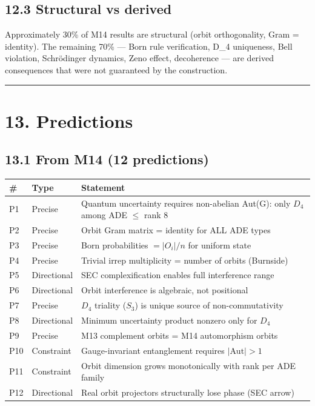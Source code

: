 \documentclass[11pt,a4paper]{article}
\begin{document}
\subsection*{12.3 Structural vs derived}

Approximately 30\% of M14 results are structural (orbit orthogonality, Gram = identity). The remaining 70\% — Born rule verification, D\_4 uniqueness, Bell violation, Schrödinger dynamics, Zeno effect, decoherence — are derived consequences that were not guaranteed by the construction.

\begin{center}\rule{0.5\linewidth}{0.4pt}\end{center}

\section*{13. Predictions}

\subsection*{13.1 From M14 (12 predictions)}

\begin{longtable}[]{@{}lll@{}}
\toprule
\# & Type & Statement \\
\midrule\endhead
P1 & Precise & Quantum uncertainty requires non-abelian Aut(G): only $D_4$ among ADE $\leq$ rank 8 \\
P2 & Precise & Orbit Gram matrix = identity for ALL ADE types \\
P3 & Precise & Born probabilities $= |O_i|/n$ for uniform state \\
P4 & Precise & Trivial irrep multiplicity = number of orbits (Burnside) \\
P5 & Directional & SEC complexification enables full interference range \\
P6 & Directional & Orbit interference is algebraic, not positional \\
P7 & Precise & $D_4$ triality ($S_3$) is unique source of non-commutativity \\
P8 & Directional & Minimum uncertainty product nonzero only for $D_4$ \\
P9 & Precise & M13 complement orbits = M14 automorphism orbits \\
P10 & Constraint & Gauge-invariant entanglement requires $|\text{Aut}| > 1$ \\
P11 & Constraint & Orbit dimension grows monotonically with rank per ADE family \\
P12 & Directional & Real orbit projectors structurally lose phase (SEC arrow) \\
\bottomrule
\end{longtable}
\end{document}
